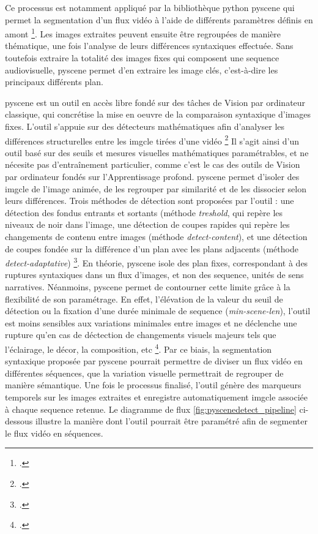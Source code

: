 Ce processus est notamment appliqué par la bibliothèque python \gls{pyscene} qui permet la segmentation d'un flux vidéo à l'aide de différents paramètres définis en amont \footcite{zotero-item-706}. Les images extraites peuvent ensuite être regroupées de manière thématique, une fois l'analyse de leurs différences syntaxiques effectuée. Sans toutefois extraire la totalité des images fixes qui composent une \gls{sequence} audiovisuelle, \gls{pyscene} permet d'en extraire les image clés, c'est-à-dire les principaux différents \gls{plan}.

\gls{pyscene} est un outil en accès libre fondé sur des tâches de \gls{Vision par ordinateur} classique, qui concrétise la mise en oeuvre de la comparaison syntaxique d'images fixes. L'outil s'appuie sur des détecteurs mathématiques afin d'analyser les différences structurelles entre les \gls{imgcle} tirées d'une vidéo \footcite{zotero-item-708} Il s’agit ainsi d’un outil basé sur des seuils et mesures visuelles mathématiques paramétrables, et ne nécesite pas d'entraînement particulier, comme c'est le cas des outils de \gls{Vision par ordinateur} fondés sur l'\gls{Apprentissage profond}. 
\gls{pyscene} permet d'isoler des \gls{imgcle} de l'image animée, de les regrouper par similarité et de les dissocier selon leurs différences. Trois méthodes de détection sont proposées par l’outil : une détection des fondus entrants et sortants (méthode \textit{treshold}, qui repère les niveaux de noir dans l’image, une détection de coupes rapides qui repère les changements de contenu entre images (méthode \textit{detect-content}), et une détection de coupes fondée sur la différence d’un plan avec les plans adjacents (méthode \textit{detect-adaptative}) \footcite{zotero-item-708}. 
En théorie, \gls{pyscene} isole des \gls{plan} fixes, correspondant à des ruptures syntaxiques dans un flux d'images, et non des \gls{sequence}, unités de sens narratives. Néanmoins, \gls{pyscene} permet de contourner cette limite grâce à la flexibilité de son paramétrage. 
En effet, l'élévation de la valeur du seuil de détection ou la fixation d'une durée minimale de \gls{sequence} (\textit{min-scene-len}), l'outil est moins sensibles aux variations minimales entre images et ne déclenche une rupture qu'en cas de déctection de changements visuels majeurs tels que l'éclairage, le décor, la composition, etc \footcite{zotero-item-708}. Par ce biais, la segmentation syntaxique proposée par \gls{pyscene} pourrait permettre de diviser un flux vidéo en différentes séquences, que la variation visuelle permettrait de regrouper de manière sémantique. Une fois le processus finalisé, l'outil génère des marqueurs temporels sur les images extraites et enregistre automatiquement \gls{imgcle} associée à chaque \gls{sequence} retenue. Le diagramme de flux \ref{fig:pyscenedetect_pipeline} ci-dessous illustre la manière dont l'outil pourrait être paramétré afin de segmenter le flux vidéo en séquences.

